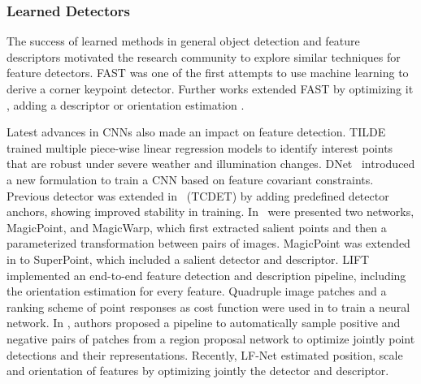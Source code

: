 
\subsubsection{Learned Detectors}
The success of learned methods in general object detection and feature descriptors motivated the research community to explore similar techniques for feature detectors. 
FAST \cite{FAST} was one of the first attempts to use machine learning to derive a corner keypoint detector. Further works extended FAST by optimizing it \cite{FASTER}, adding a descriptor \cite{BRISK} or orientation estimation \cite{ORB}.

Latest advances in CNNs also made an impact on feature detection. TILDE~\cite{TILDE} trained multiple piece-wise linear regression models to identify interest points that are robust under severe weather and illumination changes. DNet~\cite{Karel_Vedaldi_ECCV_16} introduced a new formulation to train a CNN based on feature covariant constraints. 
Previous detector was extended in~\cite{Zhang_Felix_CVPR_17} (TCDET) by adding predefined detector anchors, showing improved stability in training. In~\cite{DeTone_MagicPoint17} were presented two networks, MagicPoint, and MagicWarp, which first extracted salient points and then a parameterized transformation between pairs of images. MagicPoint was extended in \cite{detone2017superpoint} to SuperPoint, which included a salient detector and descriptor.
LIFT \cite{LIFT} implemented an end-to-end feature detection and description pipeline, including the orientation estimation for every feature. Quadruple image patches and a ranking scheme of point responses as cost function were used in \cite{savinov2016quad} to train a neural network. In \cite{Georgakis_Karanam_CVPR18}, authors proposed a pipeline to automatically sample positive and negative pairs of patches from a region proposal network to optimize jointly point detections and their representations. Recently, LF-Net \cite{OnoSerra18} estimated position, scale and orientation of features by optimizing jointly the detector and descriptor.



